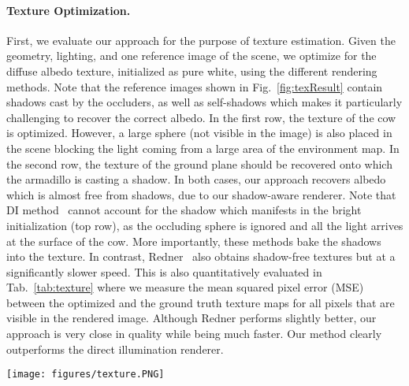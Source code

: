 \paragraph{Texture Optimization.}
%
\label{sec:texOpt}
%
First, we evaluate our approach for the purpose of texture estimation.
%
Given the geometry, lighting, and one reference image of the scene, we optimize for the diffuse albedo texture, initialized as pure white, using the different rendering methods.
%
Note that the reference images shown in Fig.~\ref{fig:texResult} contain shadows cast by the occluders, as well as self-shadows which makes it particularly challenging to recover the correct albedo.
%
In the first row, the texture of the cow is optimized.
%
However, a large sphere (not visible in the image) is also placed in the scene blocking the light coming from a large area of the environment map.
%
In the second row, the texture of the ground plane should be recovered onto which the armadillo is casting a shadow.
%
In both cases, our approach recovers albedo which is almost free from shadows, due to our shadow-aware renderer.
%
Note that DI method~\cite{ravi2020pytorch3d} cannot account for the shadow which manifests in the bright initialization (top row), as the occluding sphere is ignored and all the light arrives at the surface of the cow.
%
More importantly, these methods bake the shadows into the texture. 
%
In contrast, Redner~\cite{li2018differentiable} also obtains shadow-free textures but at a significantly slower speed.
%
This is also quantitatively evaluated in Tab.~\ref{tab:texture} where we measure the mean squared pixel error (MSE) between the optimized and the ground truth texture maps for all pixels that are visible in the rendered image.
%
Although Redner performs slightly better, our approach is very close in quality while being much faster.
%
Our method clearly outperforms the direct illumination renderer. 
%
%
\begin{figure*}
%
\texttt{[image: figures/texture.PNG]} 
%
\caption
{
%
Texture optimization results.
%
From left to right. 
%
Ground truth rendering and texture map. 
%
Rendering with initial and optimized texture map as well as the optimized texture map for Redner, DI and our method.
%
Note that our approach outperforms DI method as they cannot remove the shadow in the texture and we are also close to Redner~\cite{li2018differentiable} while being much faster.
%
}
%
\label{fig:texResult}
%
\end{figure*}
